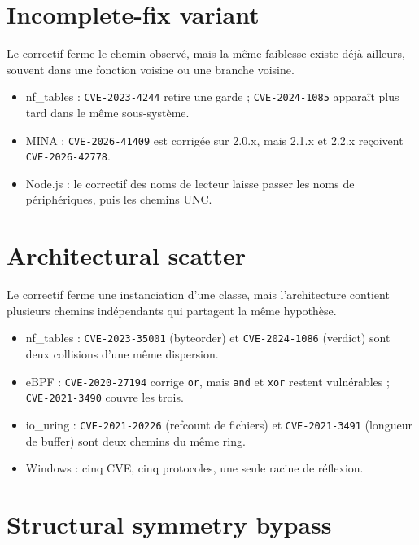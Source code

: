 \documentclass{training}
\begin{document}
\section*{Incomplete-fix variant}

Le correctif ferme le chemin observé, mais la même faiblesse existe déjà
ailleurs, souvent dans une fonction voisine ou une branche voisine.

\begin{itemize}
  \item nf\_tables : \texttt{CVE-2023-4244} retire une garde ;
        \texttt{CVE-2024-1085} apparaît plus tard dans le même sous-système.
  \item MINA : \texttt{CVE-2026-41409} est corrigée sur 2.0.x, mais 2.1.x et
        2.2.x reçoivent \texttt{CVE-2026-42778}.
  \item Node.js : le correctif des noms de lecteur laisse passer les noms de
        périphériques, puis les chemins UNC.
\end{itemize}

\section*{Architectural scatter}

Le correctif ferme une instanciation d'une classe, mais l'architecture
contient plusieurs chemins indépendants qui partagent la même hypothèse.

\begin{itemize}
  \item nf\_tables : \texttt{CVE-2023-35001} (byteorder) et
        \texttt{CVE-2024-1086} (verdict) sont deux collisions d'une même
        dispersion.
  \item eBPF : \texttt{CVE-2020-27194} corrige \texttt{or}, mais \texttt{and}
        et \texttt{xor} restent vulnérables ; \texttt{CVE-2021-3490} couvre
        les trois.
  \item io\_uring : \texttt{CVE-2021-20226} (refcount de fichiers) et
        \texttt{CVE-2021-3491} (longueur de buffer) sont deux chemins du même
        ring.
  \item Windows : cinq CVE, cinq protocoles, une seule racine de réflexion.
\end{itemize}

\section*{Structural symmetry bypass}
\end{document}
